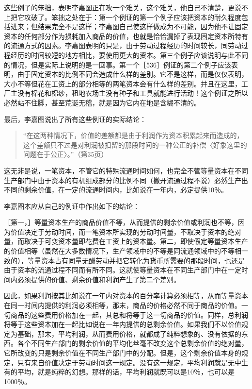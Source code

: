 这些例子的笨拙，表明李嘉图正在攻一个难关，这个难关，他自己不清楚，更说不上把它攻破了。笨拙之处在于：第一个例证的第一个例子应该把资本的耐久程度包括进来；但结果完全不是这样；李嘉图自己使这样做成为不可能，因为他不让固定资本的任何部分作为损耗加入商品的价值，也就是恰恰漏掉了表现固定资本所特有的流通方式的因素。李嘉图表明的只是，由于劳动过程经历的时间较长，同劳动过程经历的时间较短的地方相比，要使用更大的资本。第三个例子应该说明与此不同的情况，但是实际上说明的是一回事。第一个［536］例证的第二个例子应该表明，由于固定资本的比例不同会造成什么样的差别。它不是这样，而是仅仅表明，大小不等但花在工资上的部分相等的两笔资本会有什么样的差别。并且在这里，工厂主没有棉花和棉纱，租地农场主没有种子和工具就能进行活动！这个例证之所以必然站不住脚，甚至荒诞无稽，就是因为它内在地是含糊不清的。


最后，李嘉图说出了所有这些例证的实际结论：

\begin{quote}{“在这两种情况下，价值的差额都是由于利润作为资本积累起来而造成的，这个差额只不过是对利润被扣留的那段时间的一种公正的补偿〈好象这里的问题在于公正〉。”（第35页）}\end{quote}

这无非是说，一笔资本，不管它的特殊流通时间如何，也完全不管等量资本在不同生产部门中由于资本的有机组成部分的比例不同（撇开流通过程不说）必然生产出不同的剩余价值，在一定的流通时间内，比如说在一年内，必定提供10％。

李嘉图本应从自己的例证中作出如下的结论：

［第一，］等量资本生产的商品价值不等，从而提供的剩余价值或利润也不等，因为价值决定于劳动时间，而一笔资本所实现的劳动时间量，不取决于资本的绝对量，而取决于可变资本量即花费在工资上的资本量。第二，即使假定等量资本生产的价值相等（虽然在大多数情况下，生产领域中的不等是同流通领域中的不等相一致的），等量资本占有同量无酬劳动并把它转化为货币所需要的那段时间，也还是由于资本的流通过程不同而有所不同。这就使等量资本在不同生产部门中在一定时间内必须提供的价值、剩余价值和利润产生了第二个差别。

因此，如果利润按其比如说在一年内对资本的百分率计算必须相等，从而等量资本在同一时间内提供的利润必须相等，那末，商品的价格必然不同于商品的价值。一切商品的这些费用价格加在一起，其总和将等于这一切商品的价值。同样，总利润将等于这些资本加在一起比如说在一年内提供的总剩余价值。如果我们不以价值规定为基础，那末，平均利润，从而费用价格，就都成了纯粹想象的、没有依据的东西。各个不同生产部门的剩余价值的平均化丝毫不改变这个总剩余价值的绝对量，它所改变的只是剩余价值在不同生产部门中的分配。但是，这个剩余价值本身的规定，只有来自价值决定于劳动时间这一规定。没有这一规定，平均利润就是无中生有的平均，就是纯粹的幻想。那样的话，平均利润就既可以是10％，也可以是1000％。

